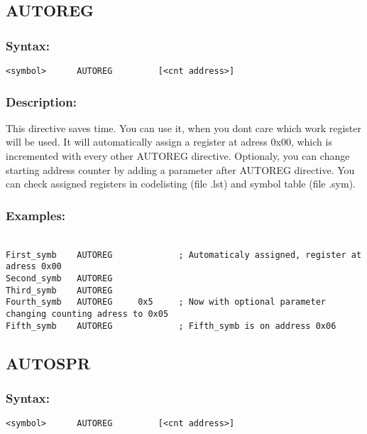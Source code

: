 {    \subsection{AUTOREG}
        \subsubsection{Syntax:}
            \verb'<symbol>      AUTOREG         [<cnt address>]'
            
        \subsubsection{Description:}
        This directive saves time. You can use it, when you dont care which work register will be used. It will automatically assign a register
        at adress 0x00, which is incremented with every other AUTOREG directive. Optionaly, you can change starting address counter by adding a parameter
        after AUTOREG directive. You can check assigned registers in codelisting (file .lst) and symbol table (file .sym).

        \subsubsection{Examples:}
            {
                ~\\
                \usecodefont
                \verb'First_symb    AUTOREG             ; Automaticaly assigned, register at adress 0x00'\\
                \verb'Second_symb   AUTOREG'\\
                \verb'Third_symb    AUTOREG'\\
                \verb'Fourth_symb   AUTOREG     0x5     ; Now with optional parameter changing counting adress to 0x05'\\
                \verb'Fifth_symb    AUTOREG             ; Fifth_symb is on address 0x06'\\
            }
            
    \subsection{AUTOSPR}
        \subsubsection{Syntax:}
            \verb'<symbol>      AUTOREG         [<cnt address>]'
           
}
